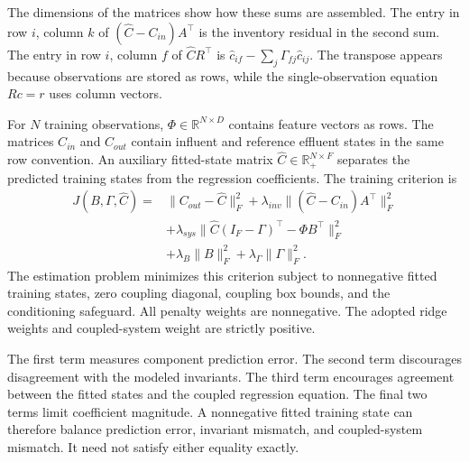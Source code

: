 The dimensions of the matrices show how these sums are assembled. The entry in row \(i\), column \(k\) of \((\widehat C-C_{in})A^\top\) is the inventory residual in the second sum. The entry in row \(i\), column \(f\) of \(\widehat C R^\top\) is \(\widehat c_{if}-\sum_j\Gamma_{fj}\widehat c_{ij}\). The transpose appears because observations are stored as rows, while the single-observation equation \(Rc=r\) uses column vectors.

For \(N\) training observations, \(\Phi\in\mathbb{R}^{N\times D}\) contains feature vectors as rows. The matrices \(C_{in}\) and \(C_{out}\) contain influent and reference effluent states in the same row convention. An auxiliary fitted-state matrix \(\widehat C\in\mathbb{R}_{+}^{N\times F}\) separates the predicted training states from the regression coefficients. The training criterion is
\begin{equation}
\label{eq:icsor_training_objective}
\begin{aligned}
J(B,\Gamma,\widehat C)={}&
\|C_{out}-\widehat C\|_F^2
+\lambda_{inv}\| (\widehat C-C_{in})A^\top\|_F^2\\
&+\lambda_{sys}\|\widehat C(I_F-\Gamma)^\top-\Phi B^\top\|_F^2\\
&+\lambda_B\|B\|_F^2+\lambda_{\Gamma}\|\Gamma\|_F^2.
\end{aligned}
\end{equation}
The estimation problem minimizes this criterion subject to nonnegative fitted training states, zero coupling diagonal, coupling box bounds, and the conditioning safeguard. All penalty weights are nonnegative. The adopted ridge weights and coupled-system weight are strictly positive.

The first term measures component prediction error. The second term discourages disagreement with the modeled invariants. The third term encourages agreement between the fitted states and the coupled regression equation. The final two terms limit coefficient magnitude. A nonnegative fitted training state can therefore balance prediction error, invariant mismatch, and coupled-system mismatch. It need not satisfy either equality exactly.

